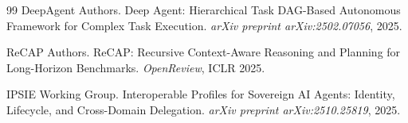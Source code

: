 \begin{thebibliography}{99}
DeepAgent Authors. \newblock Deep Agent: Hierarchical Task DAG-Based Autonomous Framework for Complex Task Execution.
\newblock \emph{arXiv preprint arXiv:2502.07056}, 2025.

ReCAP Authors. \newblock ReCAP: Recursive Context-Aware Reasoning and Planning for Long-Horizon Benchmarks.
\newblock \emph{OpenReview}, ICLR 2025.

IPSIE Working Group. \newblock Interoperable Profiles for Sovereign AI Agents: Identity, Lifecycle, and Cross-Domain Delegation.
\newblock \emph{arXiv preprint arXiv:2510.25819}, 2025.

\end{thebibliography}
